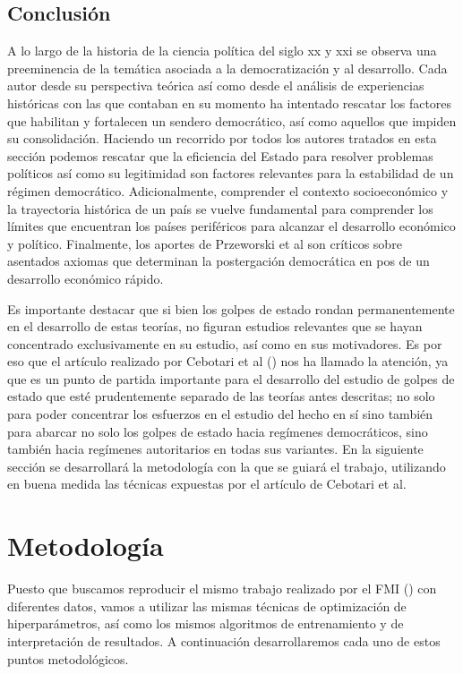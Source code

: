 \documentclass{article}
\begin{document}
\subsection{Conclusión}
A lo largo de la historia de la ciencia política del siglo xx y xxi se observa una
preeminencia de la temática asociada a la democratización y al desarrollo. Cada autor
desde su perspectiva teórica así como desde el análisis de experiencias históricas con las 
que contaban en su momento ha intentado
rescatar los factores que habilitan y fortalecen un sendero democrático, así como aquellos
que impiden su consolidación. Haciendo un recorrido por todos los autores tratados en esta
sección podemos rescatar que la eficiencia del Estado para resolver problemas políticos así
como su legitimidad son factores relevantes para la estabilidad de un régimen democrático.
Adicionalmente, comprender el contexto socioeconómico y la trayectoria histórica de un país
se vuelve fundamental para comprender los límites que encuentran los países periféricos para
alcanzar el desarrollo económico y político. Finalmente, los aportes de Przeworski et al
son críticos sobre asentados axiomas que determinan la postergación democrática en pos de un 
desarrollo económico rápido.

Es importante destacar que si bien los golpes de estado rondan permanentemente
en el desarrollo de estas teorías, no figuran estudios relevantes que se hayan concentrado
exclusivamente en su estudio, así como en sus motivadores. Es por eso que el artículo
realizado por Cebotari et al (\citeyear{Ceb24}) nos ha llamado la atención, ya que es un
punto de partida importante para el desarrollo del estudio de golpes de estado que esté
prudentemente separado de las teorías antes descritas; no solo para poder concentrar los
esfuerzos en el estudio del hecho en sí sino también para abarcar no solo los golpes de
estado hacia regímenes democráticos, sino también hacia regímenes autoritarios en todas
sus variantes. En la siguiente sección se desarrollará la metodología con la que se guiará
el trabajo, utilizando en buena medida las técnicas expuestas por el artículo de Cebotari
et al.

\section{Metodología}
Puesto que buscamos reproducir el mismo trabajo realizado por el FMI (\cite{Ceb24}) 
con diferentes datos, vamos a utilizar las mismas técnicas de optimización de 
hiperparámetros, así como los mismos algoritmos de entrenamiento y de interpretación 
de resultados. A continuación desarrollaremos cada uno de estos puntos metodológicos.
\end{document}
